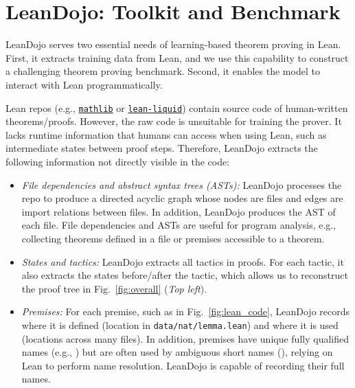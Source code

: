 \section{LeanDojo: Toolkit and Benchmark}
\label{sec:leandojo}

LeanDojo serves two essential needs of learning-based theorem proving in Lean. First, it extracts training data from Lean, and we use this capability to construct a challenging theorem proving benchmark. Second, it enables the model to interact with Lean programmatically.

Lean repos (e.g., \href{https://github.com/leanprover-community/mathlib}{\texttt{mathlib}} or \href{https://github.com/leanprover-community/lean-liquid}{\texttt{lean-liquid}}) contain source code of human-written theorems/proofs. However, the raw code is unsuitable for training the prover. It lacks runtime information that humans can access when using Lean, such as intermediate states between proof steps. Therefore, LeanDojo extracts the following information not directly visible in the code:
\begin{itemize}[leftmargin=*]

\item \emph{File dependencies and abstract syntax trees (ASTs):} LeanDojo processes the repo to produce a directed acyclic graph whose nodes are files and edges are import relations between files. In addition, LeanDojo produces the AST of each file. File dependencies and ASTs are useful for program analysis, e.g., collecting theorems defined in a file or premises accessible to a theorem.

\item \emph{States and tactics:} LeanDojo extracts all tactics in proofs. For each tactic, it also extracts the states before/after the tactic, which allows us to reconstruct the proof tree in Fig.~\ref{fig:overall} (\emph{Top left}).

\item \emph{Premises:} For each premise, such as  in Fig.~\ref{fig:lean_code}, LeanDojo records where it is defined (location in \texttt{data/nat/lemma.lean}) and where it is used (locations across many files). In addition, premises have unique fully qualified names (e.g., ) but are often used by ambiguous short names (), relying on Lean to perform name resolution. LeanDojo is capable of recording their full names.
\end{itemize}

